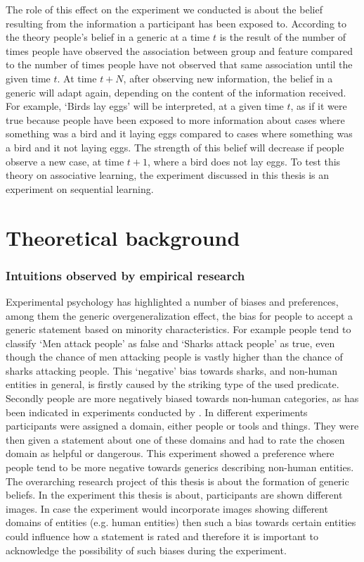 \documentclass[twoside]{uva-inf-bachelor-thesis}
\theoremstyle{definition}
\begin{document}
The role of this effect on the experiment we  conducted is about the belief resulting from the information a participant has been exposed to. According to the theory people's belief in a generic at a time $t$ is the result of the number of times people have observed the association between group and feature compared to the number of times people have not observed that same association until the given time $t$. At time $t+N$, after observing new information, the belief in a generic will adapt again, depending on the content of the information received. For example, `Birds lay eggs' will be interpreted, at a given time $t$, as if it were true because people have been exposed to more information about cases where something was a bird and it laying eggs compared to cases where something was a bird and it not laying eggs. The strength of this belief will decrease if people observe a new case, at time $t+1$, where a bird does not lay eggs. To test this theory on associative learning, the experiment discussed in this thesis is an experiment on sequential learning.


\chapter{Theoretical background}
\subsection{Intuitions observed by empirical research}
Experimental psychology has highlighted a number of biases and preferences, among them the generic overgeneralization effect, the bias for people to accept a generic statement based on minority characteristics. For example people tend to classify `Men attack people' as false and `Sharks attack people' as true, even though the chance of men attacking people is vastly higher than the chance of sharks attacking people. This `negative' bias towards sharks, and non-human entities in general, is firstly caused by the striking type of the used predicate. Secondly people are more negatively biased towards non-human categories, as has been indicated in experiments conducted by \cite{tasimi2017differences}. In different experiments participants were assigned a domain, either people or tools and things. They were then given a statement about one of these domains and had to rate the chosen domain as helpful or dangerous. This experiment showed a preference where people tend to be more negative towards generics describing non-human entities. 
The overarching research project of this thesis is about the formation of generic beliefs. In the experiment this thesis is about, participants are shown different images. In case the experiment would incorporate images showing different domains of entities (e.g. human entities) then such a bias towards certain entities could influence how a statement is rated and therefore it is important to acknowledge the possibility of such biases during the experiment.
\end{document}
